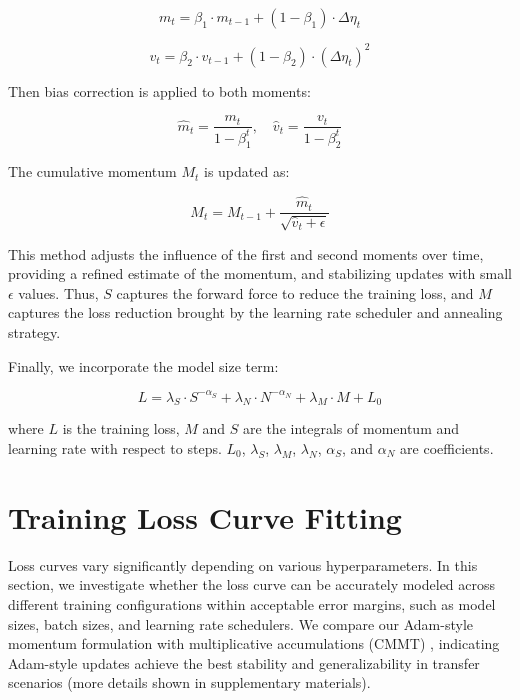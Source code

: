 \documentclass[letterpaper]{article} %
\begin{document}
\begin{equation}
    m_t = \beta_1 \cdot m_{t-1} + (1 - \beta_1) \cdot \Delta \eta_t  
\label{eq:m_t_definition}
\end{equation}


\begin{equation}
    v_t = \beta_2 \cdot v_{t-1} + (1 - \beta_2) \cdot (\Delta \eta_t)^2
\label{eq:v_t_definition}
\end{equation}

Then bias correction is applied to both moments:

\begin{equation}
    \hat{m}_t = \frac{m_t}{1 - \beta_1^t}, \quad \hat{v}_t = \frac{v_t}{1 - \beta_2^t}
\label{eq:m_t_v_t_correction}
\end{equation}

The cumulative momentum \( M_t \) is updated as:

\begin{equation}
    M_t = M_{t-1} + \frac{\hat{m}_t}{\sqrt{\hat{v}_t + \epsilon}}
\label{eq:cumulative_momentum}
\end{equation}

This method adjusts the influence of the first and second moments over time, providing a refined estimate of the momentum, and stabilizing updates with small \( \epsilon \) values. Thus, \(S\) captures the forward force to reduce the training loss, and \(M\) captures the loss reduction brought by the learning rate scheduler and annealing strategy.

Finally, we incorporate the model size term:

\begin{equation}
    L = \lambda_S \cdot S^{-\alpha_S} + \lambda_N \cdot N^{-\alpha_N} + \lambda_M \cdot M + L_0
\label{eq:Loss_S_N_M_E_function}
\end{equation}

\noindent 
where \(L\) is the training loss, \(M\) and \(S\) are the integrals of momentum and learning rate with respect to steps. \(L_0\), \(\lambda_S\), \(\lambda_M\), \(\lambda_N\), \(\alpha_S\), and \(\alpha_N\) are coefficients.



\section{Training Loss Curve Fitting}

Loss curves vary significantly depending on various hyperparameters. In this section, we investigate whether the loss curve can be accurately modeled across different training configurations within acceptable error margins, such as model sizes, batch sizes, and learning rate schedulers. We compare our Adam-style momentum formulation with multiplicative accumulations (CMMT) \citep{tissue2024scaling}, indicating Adam-style updates achieve the best stability and generalizability in transfer scenarios (more details shown in supplementary materials).
\end{document}
